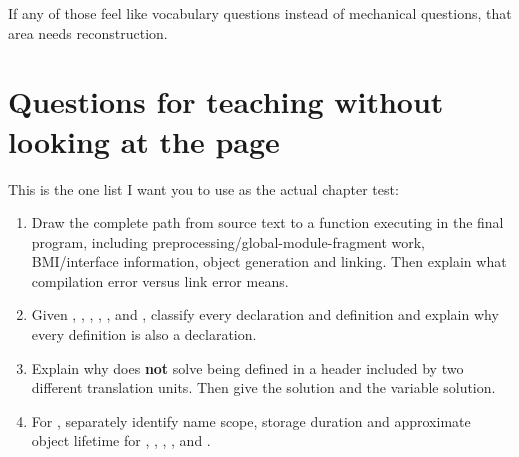If any of those feel like vocabulary questions instead of mechanical questions, that area needs reconstruction.

\section{Questions for teaching without looking at the page}\label{05-engine-i-ch004-questions-for-teaching-without-looking-at-the-page}

\hypertarget{05-engine-i-ch004-questions-for-teaching-without-looking-at-the-page}{}

This is the one list I want you to use as the actual chapter test:

\begin{enumerate}
\def\labelenumi{\arabic{enumi}.}
\item
  Draw the complete path from  source text to a function executing in the final program, including preprocessing/global-module-fragment work, BMI/interface information, object generation and linking. Then explain what compilation error versus link error means.
\item
  Given , , , , , and , classify every declaration and definition and explain why every definition is also a declaration.
\item
  Explain why  does \textbf{not} solve  being defined in a header included by two different translation units. Then give the  solution and the  variable solution.
\item
  For , separately identify name scope, storage duration and approximate object lifetime for , , , , and .

\end{enumerate}
